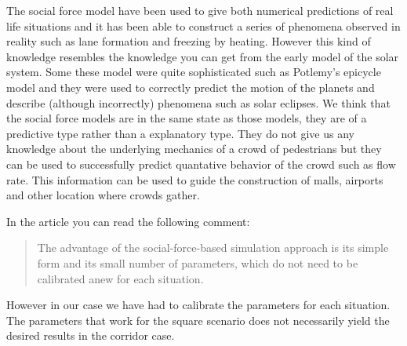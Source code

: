 The social force model have been used to give both numerical predictions of 
real life situations and it has been able to construct a series of phenomena 
observed in reality such as lane formation and freezing by heating.
However this kind of knowledge resembles the knowledge you can get from 
the early model of the solar system. Some these model were quite sophisticated 
such as Potlemy's epicycle model and they were used to correctly predict the 
motion of the planets and describe (although incorrectly) phenomena such as 
solar eclipses.
We think that the social force models are in the same state as those models, 
they are of a predictive type rather than a explanatory type. They do not give 
us any knowledge about the underlying mechanics of a crowd of pedestrians but 
they can be used to successfully predict quantative behavior of the crowd such 
as flow rate. This information can be used to guide the construction of malls, 
airports and other location where crowds gather.

In the article \cite{self-org} you can read the following comment:

\begin{quote}
	The advantage of the social-force-based simulation
	approach is its simple form and its small number of
	parameters, which do not need to be calibrated anew
	for each situation.
\end{quote}

However in our case we have had to calibrate the parameters for each 
situation. The parameters that work for the square scenario does not 
necessarily yield the desired results in the corridor case.